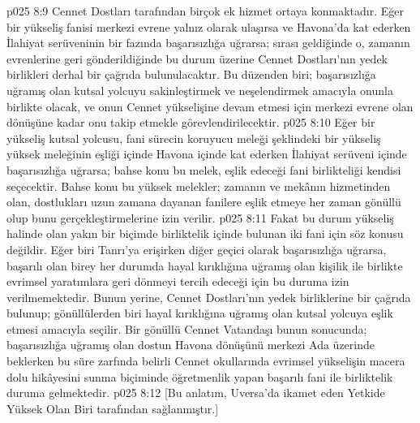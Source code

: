 \vs p025 8:9 Cennet Dostları tarafından birçok ek hizmet ortaya konmaktadır. Eğer bir yükseliş fanisi merkezi evrene yalnız olarak ulaşırsa ve Havona’da kat ederken İlahiyat serüveninin bir fazında başarısızlığa uğrarsa; sırası geldiğinde o, zamanın evrenlerine geri gönderildiğinde bu durum üzerine Cennet Dostları’nın yedek birlikleri derhal bir çağrıda bulunulacaktır. Bu düzenden biri; başarısızlığa uğramış olan kutsal yolcuyu sakinleştirmek ve neşelendirmek amacıyla onunla birlikte olacak, ve onun Cennet yükselişine devam etmesi için merkezi evrene olan dönüşüne kadar onu takip etmekle görevlendirilecektir.
\vs p025 8:10 Eğer bir yükseliş kutsal yolcusu, fani sürecin koruyucu meleği şeklindeki bir yükseliş yüksek meleğinin eşliği içinde Havona içinde kat ederken İlahiyat serüveni içinde başarısızlığa uğrarsa; bahse konu bu melek, eşlik edeceği fani birlikteliği kendisi seçecektir. Bahse konu bu yüksek melekler; zamanın ve mekânın hizmetinden olan, dostlukları uzun zamana dayanan fanilere eşlik etmeye her zaman gönüllü olup bunu gerçekleştirmelerine izin verilir.
\vs p025 8:11 Fakat bu durum yükseliş halinde olan yakın bir biçimde birliktelik içinde bulunan iki fani için söz konusu değildir. Eğer biri Tanrı’ya erişirken diğer geçici olarak başarısızlığa uğrarsa, başarılı olan birey her durumda hayal kırıklığına uğramış olan kişilik ile birlikte evrimsel yaratımlara geri dönmeyi tercih edeceği için bu duruma izin verilmemektedir. Bunun yerine, Cennet Dostları’nın yedek birliklerine bir çağrıda bulunup; gönüllülerden biri hayal kırıklığına uğramış olan kutsal yolcuya eşlik etmesi amacıyla seçilir. Bir gönüllü Cennet Vatandaşı bunun sonucunda; başarısızlığa uğramış olan dostun Havona dönüşünü merkezi Ada üzerinde beklerken bu süre zarfında belirli Cennet okullarında evrimsel yükselişin macera dolu hikâyesini sunma biçiminde öğretmenlik yapan başarılı fani ile birliktelik duruma gelmektedir.
\vs p025 8:12 [Bu anlatım, Uversa’da ikamet eden Yetkide Yüksek Olan Biri tarafından sağlanmıştır.]
